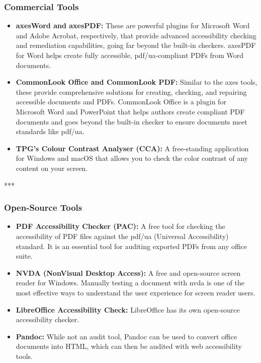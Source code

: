 \subsubsection{Commercial Tools}
\label{sub:commercial-tools}

\begin{itemize}
	\item \textbf{axesWord and axesPDF\supercite{AxesCheck}:} These are powerful plugins for Microsoft Word and Adobe Acrobat, respectively, that provide advanced accessibility checking and remediation capabilities, going far beyond the built-in checkers. axesPDF for Word helps create fully accessible, \gls{pdf/ua}-compliant PDFs from Word documents.
	\item \textbf{CommonLook Office and CommonLook PDF\supercite{AllyantCommonLook}:} Similar to the axes tools, these provide comprehensive solutions for creating, checking, and repairing accessible documents and PDFs. CommonLook Office is a plugin for Microsoft Word and PowerPoint that helps authors create compliant PDF documents and goes beyond the built-in checker to ensure documents meet standards like \gls{pdf/ua}.
	\item \textbf{TPG's Colour Contrast Analyser (CCA)\supercite{TGPiCCA}:} A free-standing application for Windows and macOS that allows you to check the color contrast of any content on your screen.
\end{itemize}

***

\subsubsection{Open-Source Tools}
\label{sub:open-source-tools}

\begin{itemize}
	\item \textbf{PDF Accessibility Checker (PAC)\supercite{AxesCheck}:} A free tool for checking the accessibility of PDF files against the \gls{pdf/ua} (Universal Accessibility) standard. It is an essential tool for auditing exported PDFs from any office suite.
	\item \textbf{NVDA (NonVisual Desktop Access)\supercite{NVDA}:} A free and open-source screen reader for Windows. Manually testing a document with \gls{nvda} is one of the most effective ways to understand the user experience for screen reader users.
	\item \textbf{LibreOffice Accessibility Check\supercite{AccessODF}:} LibreOffice has its own open-source accessibility checker.
	\item \textbf{Pandoc\supercite{Pandoc}:} While not an audit tool, Pandoc can be used to convert office documents into HTML, which can then be audited with web accessibility tools.
\end{itemize}

